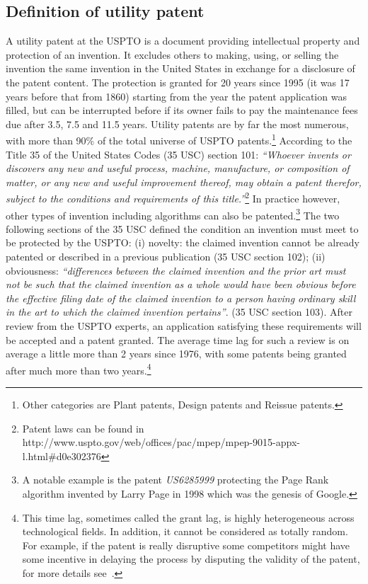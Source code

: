 \documentclass[10pt,A4]{article}
\begin{document}
\subsection*{Definition of utility patent} 

A utility patent at the USPTO is a document providing intellectual property and protection of an invention. It excludes others to making, using, or selling the invention the same invention in the United States in exchange for a disclosure of the patent content. The protection is granted for 20 years since 1995 (it was 17 years before that from 1860) starting from the year the patent application was filled, but can be interrupted before if its owner fails to pay the maintenance fees due after 3.5, 7.5 and 11.5 years. Utility patents are by far the most numerous, with more than 90\% of the total universe of USPTO patents.\footnote{Other categories are Plant patents, Design patents and Reissue patents.} According to the Title 35 of the United States Codes (35 USC) section 101: \textit{``Whoever invents or discovers any new and useful process, machine, manufacture, or composition of matter, or any new and useful improvement thereof, may obtain a patent therefor, subject to the conditions and requirements of this title.''}\footnote{%
Patent laws can be found in http://www.uspto.gov/web/offices/pac/mpep/mpep-9015-appx-l.html\#d0e302376} In practice however, other types of invention including algorithms can also be patented.\footnote{A notable example is the patent \textit{US6285999} protecting the Page Rank algorithm invented by Larry Page in 1998 which was the genesis of Google.} The two following sections of the 35 USC defined the condition an invention must meet to be protected by the USPTO: (i) novelty: the claimed invention cannot be already patented or described in a previous publication (35 USC section 102); (ii) obviousness: \textit{``differences between the claimed invention and the prior art must not be such that the claimed invention as a whole would have been obvious before the effective filing date of the claimed invention to a person having ordinary skill in the art to which the claimed invention pertains''}. (35 USC section 103). After review from the USPTO experts, an application satisfying these requirements will be accepted and a patent granted. The average time lag for such a review is on average a little more than 2 years since 1976, with some patents being granted after much more than two years.\footnote{This time lag, sometimes called the grant lag, is highly heterogeneous across technological fields. In addition, it cannot be considered as totally random. For example, if the patent is really disruptive some competitors might have some incentive in delaying the process by disputing the validity of the patent, for more details see~\cite{regibeau2010}.}
\end{document}
